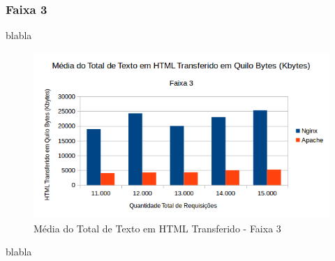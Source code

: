 \subsubsection{Faixa 3}
blabla

\begin{figure}[htb]
	\centering
	\includegraphics[width=0.6\linewidth]{graficos/grafico3-f3} 
	\caption{Média do Total de Texto em HTML Transferido - Faixa 3}
	\label{fig:grafico3-f3}
\end{figure}
blabla